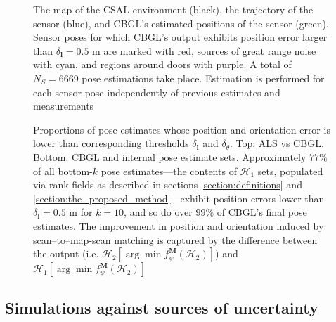 \begin{figure}
  
  \vspace{-0.7cm}
  \caption{\small The map of the CSAL environment (black), the trajectory of
           the sensor (blue), and CBGL's estimated positions of the sensor
           (green). Sensor poses for which CBGL's output exhibits position error
           larger than $\delta_{\bm{l}} = 0.5$ m are marked with red, sources
           of great range noise with cyan, and regions around doors with
           purple. A total of $N_S = 6669$ pose estimations take place.
           Estimation is performed for each sensor pose independently of
           previous estimates and measurements}
  \label{fig:a:map_and_trajectory}
\end{figure}

\begin{figure}
  \vspace{-0.4cm}
  
  \vspace{0.1cm}
  \caption{\small Proportions of pose estimates whose position and orientation
           error is lower than corresponding thresholds $\delta_{\bm{l}}$ and
           $\delta_{\theta}$. Top: ALS vs CBGL. Bottom: CBGL and internal pose
           estimate sets.  Approximately $77\%$ of all bottom-$k$ pose
           estimates---the contents of $\mathcal{H}_1$ sets, populated via rank
           fields as described in sections \ref{section:definitions} and
           \ref{section:the_proposed_method}---exhibit position errors lower
           than $\delta_{\bm{l}} = 0.5$ m for $k=10$, and so do over $99\%$ of
           CBGL's final pose estimates. The improvement in position and
           orientation induced by scan--to--map-scan matching is captured by
           the difference between the output (i.e.  $\mathcal{H}_2[\arg \min
           f_{\psi}^{\bm{M}}(\mathcal{H}_2)]$) and $\mathcal{H}_1[\arg \min
           f_{\psi}^{\bm{M}}(\mathcal{H}_2)]$}
  \label{fig:a:awesomeness}
\end{figure}


\subsection{Simulations against sources of uncertainty}
\label{subsec:exp_b}


